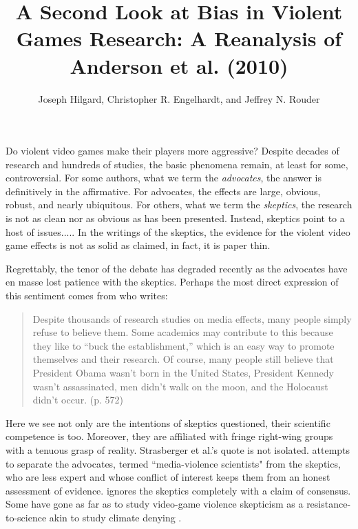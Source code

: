 \documentclass[man]{apa6}
\author{Joseph Hilgard, Christopher R. Engelhardt, and Jeffrey N. Rouder}
\title{A Second Look at Bias in Violent Games Research: A Reanalysis of Anderson et al. (2010)}
\affiliation{University of Missouri}
\begin{document}
\maketitle


Do violent video games make their players more aggressive? Despite decades of research and hundreds of studies, the basic phenomena remain, at least for some, controversial.  For some authors, what we term the {\em advocates}, the answer is definitively in the affirmative.  For advocates, the effects are large, obvious, robust, and nearly ubiquitous.  For others, what we term the {\em skeptics}, the research is not as clean nor as obvious as has been presented.  Instead, skeptics point to a host of issues.....  In the writings of the skeptics, the evidence for the violent video game effects is not as solid as claimed, in fact, it is paper thin.

Regrettably, the tenor of the debate has degraded recently as the advocates have en masse lost patience with the skeptics.  
Perhaps the most direct expression of this sentiment comes from \citet{Strasburger:etal:2014} who writes:

\begin{quote}
Despite thousands of research studies on media effects, many people simply refuse to believe them. Some academics may contribute to this because they like to ``buck the establishment,'' which is an easy way to promote themselves and their research. Of course, many people still believe that President Obama wasn't born in the United States, President Kennedy wasn't assassinated, men didn't walk on the moon, and the Holocaust didn't occur. (p. 572)
\end{quote}

Here we see not only are the intentions of skeptics questioned, their scientific competence is too.  Moreover, they are affiliated with fringe right-wing groups with a tenuous grasp of reality.  Strasberger et al.'s quote is not isolated.   \citet{Anderson:etal:2014} attempts to separate the advocates, termed ``media-violence scientists" from the skeptics, who are less expert and whose conflict of interest keeps them from an honest assessment of evidence.    \citet{Bushman:etal:2014} ignores the skeptics completely with a claim of consensus.   Some have gone as far as to study video-game violence skepticism as a resistance-to-science akin to study climate denying \citep[see ][]{Greitemeyer:2014,Nauroth:etal:2014}.
\end{document}
